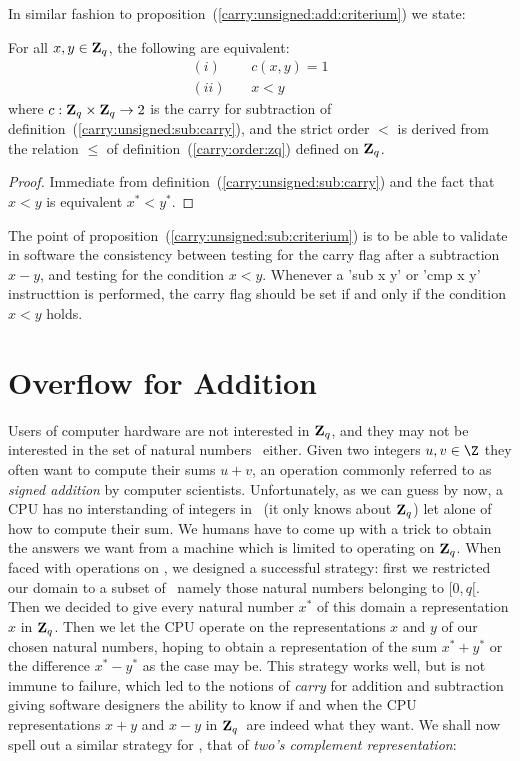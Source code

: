 \documentclass{article}
\newcommand{\zq}{\mbox{${\bf Z}_{q}$}}
\begin{document}
In similar fashion to proposition~(\ref{carry:unsigned:add:criterium}) we state:

\begin{prop}\label{carry:unsigned:sub:criterium}
  For all $x,y\in\zq$, the following are equivalent:
    \begin{eqnarray*}
      (i)&\ &c(x,y) = 1\\
      (ii)&\ & x < y
    \end{eqnarray*}
where $c:\zq\times\zq\rightarrow 2$ is the carry for subtraction of 
  definition~(\ref{carry:unsigned:sub:carry}), and the strict order $<$
  is derived from the relation $\leq$ of 
  definition~(\ref{carry:order:zq}) defined on \zq.
\end{prop}
\begin{proof}
Immediate from definition~(\ref{carry:unsigned:sub:carry}) and the fact 
that $x<y$ is equivalent $x^{*}<y^{*}$.
\end{proof}

The point of proposition~(\ref{carry:unsigned:sub:criterium}) is to be 
able to validate in software the consistency between testing for the 
carry flag after a subtraction $x-y$, and testing for the condition $x<y$.
Whenever a 'sub x y' or 'cmp x y' instructtion is performed, the carry 
flag should be set if and only if the condition $x<y$ holds.

\section{Overflow for Addition}
Users of computer hardware are not interested in \zq, and they may not be
interested in the set of natural numbers \N\ either. Given two integers 
$u,v\in\Z$ they often want to compute their sums $u+v$, an operation 
commonly referred to as {\em signed addition} by computer scientists.
Unfortunately, as we can guess by now, a CPU has no interstanding of
integers in \Z\ (it only knows about \zq) let alone of how to compute
their sum. We humans have to come up with a trick to obtain the answers
we want from a machine which is limited to operating on \zq. When faced
with operations on \N, we designed a successful strategy: first we 
restricted our domain to a subset of \N\ namely those natural numbers
belonging to $[0,q[$. Then we decided to give every natural number $x^{*}$
of this domain a representation $x$ in \zq. Then we let the CPU operate
on the representations $x$ and $y$ of our chosen natural numbers, 
hoping to obtain a representation of the sum $x^{*} + y^{*}$ or the 
difference $x^{*}-y^{*}$ as the case may be. This strategy works well,
but is not immune to failure, which led to the notions of {\em carry}
for addition and subtraction giving software designers the ability
to know if and when the CPU representations $x+y$ and $x-y$ in \zq\ 
are indeed what they want. We shall now spell out a similar strategy 
for \Z, that of {\em two's complement representation}:
\end{document}
